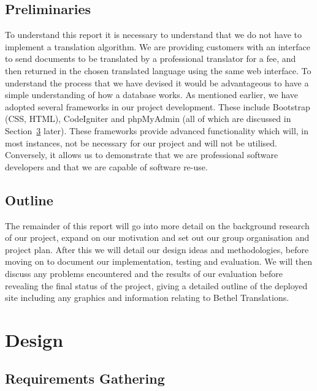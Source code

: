 \documentclass{l3proj}
\begin{document}
\section{Preliminaries}
To understand this report it is necessary to understand that we do not have to
implement a translation algorithm. We are providing customers with an interface
to send documents to be translated by a professional translator for a fee, and
then returned in the chosen translated language using the same web interface. To
understand the process that we have devised it would be advantageous to have a
simple understanding of how a database works. As mentioned earlier, we have
adopted several frameworks in our project development. These include Bootstrap
(CSS, HTML), CodeIgniter and phpMyAdmin (all of which are discussed in
Section~\ref{chap:design} later). These frameworks provide advanced
functionality which will, in most instances, not be necessary for our project
and will not be utilised. Conversely, it allows us to demonstrate that we are
professional software developers and that we are capable of software re-use.

\section{Outline}
The remainder of this report will go into more detail on the background research
of our project, expand on our motivation and set out our group organisation and
project plan. After this we will detail our design ideas and methodologies,
before moving on to document our implementation, testing and evaluation. We will
then discuss any problems encountered and the results of our evaluation before
revealing the final status of the project, giving a detailed outline of the
deployed site including any graphics and information relating to Bethel
Translations.
 

\chapter{Design}
\label{chap:design}
\section{Requirements Gathering}
\end{document}
